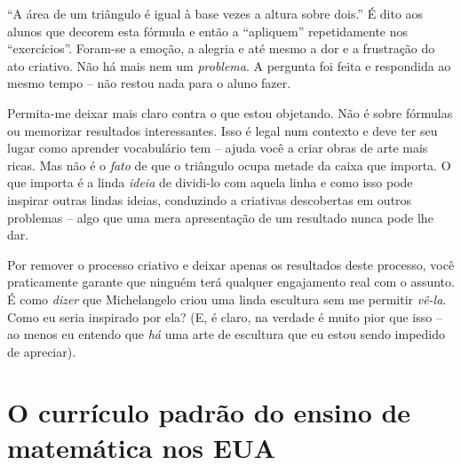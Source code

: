 \documentclass[a4paper,oneside,10pt,notitlepage]{article}
\begin{document}
\vspace{1em}

``A área de um triângulo é igual à base vezes a altura sobre dois.''
É dito aos alunos que decorem esta fórmula e então a ``apliquem'' repetidamente nos ``exercícios''.
Foram-se a emoção, a alegria e até mesmo a dor e a frustração do ato criativo.
Não há mais nem um \textsl{problema}.
A pergunta foi feita e respondida ao mesmo tempo -- não restou nada para o aluno fazer.

Permita-me deixar mais claro contra o que estou objetando.
Não é sobre fórmulas ou memorizar resultados interessantes.
Isso é legal num contexto e deve ter seu lugar como aprender vocabulário tem -- ajuda você a criar obras de arte mais ricas.
Mas não é o \textsl{fato} de que o triângulo ocupa metade da caixa que importa.
O que importa é a linda \textsl{ideia} de dividi-lo com aquela linha e como isso pode inspirar outras lindas ideias, conduzindo a criativas descobertas em outros problemas -- algo que uma mera apresentação de um resultado nunca pode lhe dar.

Por remover o processo criativo e deixar apenas os resultados deste processo, você praticamente garante que ninguém terá qualquer engajamento real com o assunto.
É como \textsl{dizer} que Michelangelo criou uma linda escultura sem me permitir \textsl{vê-la}.
Como eu seria inspirado por ela?
(E, é claro, na verdade é muito pior que isso -- ao menos eu entendo que \textsl{há} uma arte de escultura que eu estou sendo impedido de apreciar).










\section*{O currículo padrão do ensino de matemática nos EUA}
\end{document}
